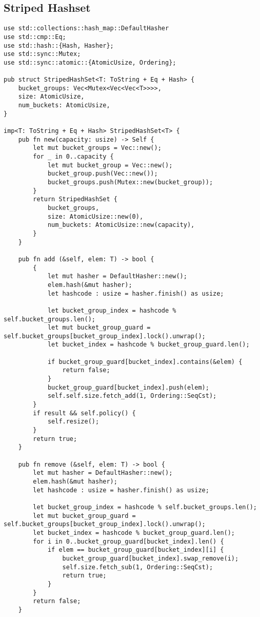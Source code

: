 \documentclass[twocolumn,landscape,10pt]{article}
\theoremstyle{definition}
\begin{document}
\subsection{Striped Hashset}
\begin{lstlisting}[Rust]
use std::collections::hash_map::DefaultHasher
use std::cmp::Eq;
use std::hash::{Hash, Hasher};
use std::sync::Mutex;
use std::sync::atomic::{AtomicUsize, Ordering};

pub struct StripedHashSet<T: ToString + Eq + Hash> {
    bucket_groups: Vec<Mutex<Vec<Vec<T>>>>,
    size: AtomicUsize,
    num_buckets: AtomicUsize,
}

imp<T: ToString + Eq + Hash> StripedHashSet<T> {
    pub fn new(capacity: usize) -> Self {
        let mut bucket_groups = Vec::new();
        for _ in 0..capacity {
            let mut bucket_group = Vec::new();
            bucket_group.push(Vec::new());
            bucket_groups.push(Mutex::new(bucket_group));
        }
        return StripedHashSet {
            bucket_groups,
            size: AtomicUsize::new(0),
            num_buckets: AtomicUsize::new(capacity),
        }
    }

    pub fn add (&self, elem: T) -> bool {
        {
            let mut hasher = DefaultHasher::new();
            elem.hash(&mut hasher);
            let hashcode : usize = hasher.finish() as usize;

            let bucket_group_index = hashcode % self.bucket_groups.len();
            let mut bucket_group_guard = self.bucket_groups[bucket_group_index].lock().unwrap();
            let bucket_index = hashcode % bucket_group_guard.len();

            if bucket_group_guard[bucket_index].contains(&elem) {
                return false;
            }
            bucket_group_guard[bucket_index].push(elem);
            self.self.size.fetch_add(1, Ordering::SeqCst);
        }
        if result && self.policy() {
            self.resize();
        }
        return true;
    }

    pub fn remove (&self, elem: T) -> bool {
        let mut hasher = DefaultHasher::new();
        elem.hash(&mut hasher);
        let hashcode : usize = hasher.finish() as usize;

        let bucket_group_index = hashcode % self.bucket_groups.len();
        let mut bucket_group_guard = self.bucket_groups[bucket_group_index].lock().unwrap();
        let bucket_index = hashcode % bucket_group_guard.len();
        for i in 0..bucket_group_guard[bucket_index].len() {
            if elem == bucket_group_guard[bucket_index][i] {
                bucket_group_guard[bucket_index].swap_remove(i);
                self.size.fetch_sub(1, Ordering::SeqCst);
                return true;
            }
        }
        return false;
    }


\end{lstlisting}
\end{document}
